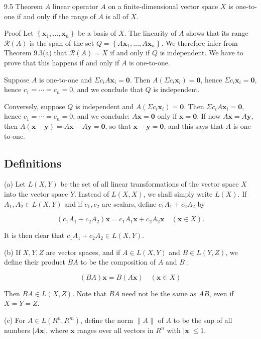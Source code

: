 \documentclass[10pt]{article}
\begin{document}
9.5 Theorem $A$ linear operator $A$ on a finite-dimensional vector space $X$ is one-to-one if and only if the range of $A$ is all of $X$.

Proof Let $\left\{\mathbf{x}_{1}, \ldots, \mathbf{x}_{n}\right\}$ be a basis of $X$. The linearity of $A$ shows that its range $\mathscr{R}(A)$ is the span of the set $Q=\left\{A \mathbf{x}_{1}, \ldots, A \mathbf{x}_{n}\right\}$. We therefore infer from Theorem 9.3(a) that $\mathscr{R}(A)=X$ if and only if $Q$ is independent. We have to prove that this happens if and only if $A$ is one-to-one.

Suppose $A$ is one-to-one and $\Sigma c_{i} A \mathbf{x}_{i}=\mathbf{0}$. Then $A\left(\Sigma c_{i} \mathbf{x}_{i}\right)=\mathbf{0}$, hence $\Sigma c_{i} \mathbf{x}_{i}=\mathbf{0}$, hence $c_{1}=\cdots=c_{n}=0$, and we conclude that $Q$ is independent.

Conversely, suppose $Q$ is independent and $A\left(\Sigma c_{i} \mathbf{x}_{i}\right)=\mathbf{0}$. Then $\Sigma c_{i} A \mathbf{x}_{i}=\mathbf{0}$, hence $c_{1}=\cdots=c_{n}=0$, and we conclude: $A \mathbf{x}=\mathbf{0}$ only if $\mathbf{x}=\mathbf{0}$. If now $A \mathbf{x}=A \mathbf{y}$, then $A(\mathbf{x}-\mathbf{y})=A \mathbf{x}-A \mathbf{y}=\mathbf{0}$, so that $\mathbf{x}-\mathbf{y}=\mathbf{0}$, and this says that $A$ is one-to-one.

\subsection{Definitions}
(a) Let $L(X, Y)$ be the set of all linear transformations of the vector space $X$ into the vector space $Y$. Instead of $L(X, X)$, we shall simply write $L(X)$. If $A_{1}, A_{2} \in L(X, Y)$ and if $c_{1}, c_{2}$ are scalars, define $c_{1} A_{1}+c_{2} A_{2}$ by

$$
\left(c_{1} A_{1}+c_{2} A_{2}\right) \mathbf{x}=c_{1} A_{1} \mathbf{x}+c_{2} A_{2} \mathbf{x} \quad(\mathbf{x} \in X) .
$$

It is then clear that $c_{1} A_{1}+c_{2} A_{2} \in L(X, Y)$.

(b) If $X, Y, Z$ are vector spaces, and if $A \in L(X, Y)$ and $B \in L(Y, Z)$, we define their product $B A$ to be the composition of $A$ and $B$ :

$$
(B A) \mathbf{x}=B(A \mathbf{x}) \quad(\mathbf{x} \in X)
$$

Then $B A \in L(X, Z)$. Note that $B A$ need not be the same as $A B$, even if $X=Y=Z$.

(c) For $A \in L\left(R^{n}, R^{m}\right)$, define the norm $\|A\|$ of $A$ to be the sup of all numbers $|A \mathbf{x}|$, where $\mathbf{x}$ ranges over all vectors in $R^{n}$ with $|\mathbf{x}| \leq 1$.
\end{document}
